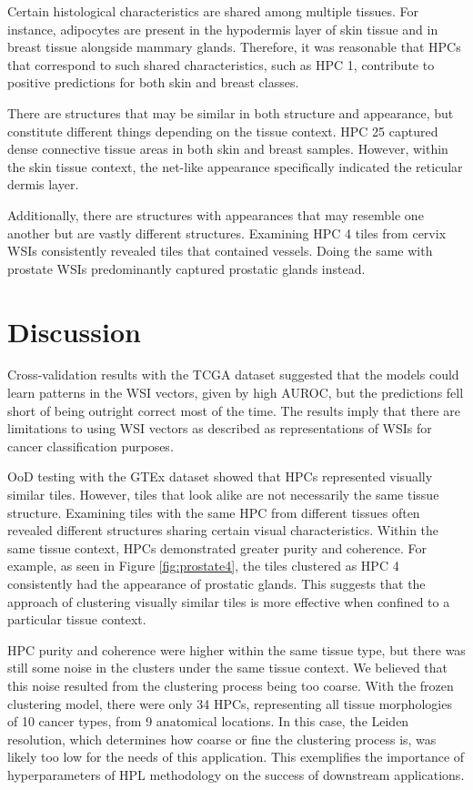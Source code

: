 \documentclass{l4proj}
\begin{document}
Certain histological characteristics are shared among multiple tissues. For instance, adipocytes are present in the hypodermis layer of skin tissue and in breast tissue alongside mammary glands. Therefore, it was reasonable that HPCs that correspond to such shared characteristics, such as HPC 1, contribute to positive predictions for both skin and breast classes.

There are structures that may be similar in both structure and appearance, but constitute different things depending on the tissue context. HPC 25 captured dense connective tissue areas in both skin and breast samples. However, within the skin tissue context, the net-like appearance specifically indicated the reticular dermis layer.

Additionally, there are structures with appearances that may resemble one another but are vastly different structures. Examining HPC 4 tiles from cervix WSIs consistently revealed tiles that contained vessels. Doing the same with prostate WSIs predominantly captured prostatic glands instead. 

\section{Discussion} \label{sec:discuss-classifier}
 Cross-validation results with the TCGA dataset suggested that the models could learn patterns in the WSI vectors, given by high AUROC, but the predictions fell short of being outright correct most of the time. The results imply that there are limitations to using WSI vectors as described as representations of WSIs for cancer classification purposes.

OoD testing with the GTEx dataset showed that HPCs represented visually similar tiles. However, tiles that look alike are not necessarily the same tissue structure. Examining tiles with the same HPC from different tissues often revealed different structures sharing certain visual characteristics. Within the same tissue context, HPCs demonstrated greater purity and coherence. For example, as seen in Figure \ref{fig:prostate4}, the tiles clustered as HPC 4 consistently had the appearance of prostatic glands. This suggests that the approach of clustering visually similar tiles is more effective when confined to a particular tissue context.

HPC purity and coherence were higher within the same tissue type, but there was still some noise in the clusters under the same tissue context. We believed that this noise resulted from the clustering process being too coarse. With the frozen clustering model, there were only 34 HPCs, representing all tissue morphologies of 10 cancer types, from 9 anatomical locations. In this case, the Leiden resolution, which determines how coarse or fine the clustering process is, was likely too low for the needs of this application. This exemplifies the importance of hyperparameters of HPL methodology on the success of downstream applications.
\end{document}
